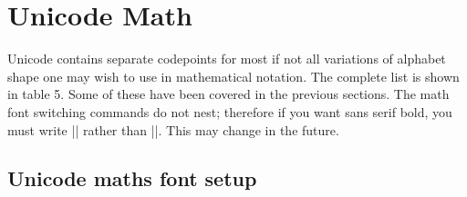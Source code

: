 \newcommand\showlbrace[3]{\par\noindent\hangindent=6em%
  \makebox[5em][l]{$\Biggl#1\biggl#1\Bigl#1\bigl#1#1$}\makebox[3.5em][l]{\small\texttt{U+#2}} \cmd{#1}$^{#3}$
  [Math delimiters] {#1}
  }

\newcommand\showrbrace[3]{\par\noindent\hangindent=6em%
  \makebox[5em][l]{$#1\bigr#1\Bigr#1\biggr#1\Biggr#1$}\makebox[3.5em][l]{\small\texttt{U+#2}} \cmd{#1}$^{#3}$
  [Math delimiters] {#1}
  }

\newcommand\showwideaccent[3]{\par\noindent\hangindent=4em%
  \makebox[3em][l]{$#1{xxx}$}\makebox[3.5em][l]{\small\texttt{U+#2}} \cmd{#1}$^{#3}$
  \indexmathcmd [Math accents] {#1{abc}}
  }

\newcommand\showaccent[3]{\par\noindent\hangindent=4em%
  \makebox[3em][l]{$#1b$}\makebox[3.5em][l]{\small\texttt{U+#2}} \cmd{#1}$^{#3}$
  \indexmathcmd [Math accents] {#1 b}
  }
  
\newcommand\showover[3]{\par\noindent\hangindent=6em%
  \makebox[5em][l]{$#1{xxxxxx}$}\makebox[3.5em][l]{\small\texttt{U+#2}} \cmd{#1}$^{#3}$
  \indexmathcmd [Math over and under brackets] {#1{xxxxxx}}
  }
  
\chapter{Unicode Math}
Unicode contains separate codepoints for most if not all variations of alphabet
shape one may wish to use in mathematical notation. The complete list is shown
in table 5. Some of these have been covered in the previous sections.
The math font switching commands do not nest; therefore if you want sans
serif bold, you must write || rather than ||.
This may change in the future.

\section{Unicode maths font setup}

